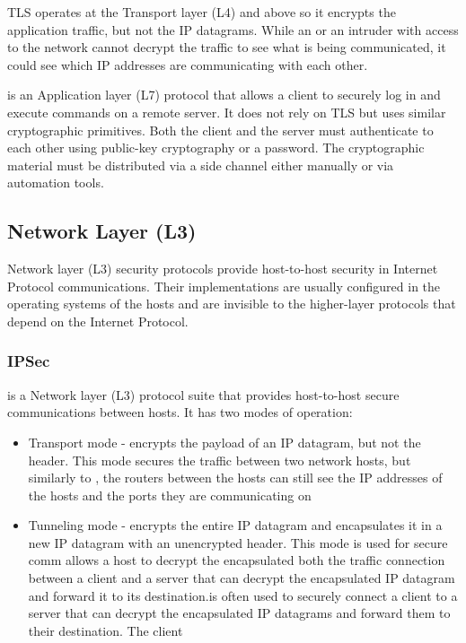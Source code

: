 TLS operates at the Transport layer (L4) and above so it encrypts the application traffic, but not the IP datagrams. While an  or an intruder with access to the network cannot decrypt the traffic to see what is being communicated, it could see which IP addresses are communicating with each other.

 is an Application layer (L7) protocol that allows a client to securely log in and execute commands on a remote server. It does not rely on TLS but uses similar cryptographic primitives. Both the client and the server must authenticate to each other using public-key cryptography or a password. The cryptographic material must be distributed via a side channel either manually or via automation tools.

\subsection{Network Layer (L3)}\label{thesis__020-internet.md__network-layer-l3-1}

Network layer (L3) security protocols provide host-to-host security in Internet Protocol communications. Their implementations are usually configured in the operating systems of the hosts and are invisible to the higher-layer protocols that depend on the Internet Protocol.

\subsubsection{IPSec}\label{thesis__020-internet.md__ipsec}

 is a Network layer (L3) protocol suite that provides host-to-host secure communications between  hosts. It has two modes of operation:

\begin{itemize}
\tightlist
\item
  Transport mode - encrypts the payload of an IP datagram, but not the header. This mode secures the traffic between two network hosts, but similarly to , the routers between the hosts can still see the IP addresses of the hosts and the ports they are communicating on
\item
  Tunneling mode - encrypts the entire IP datagram and encapsulates it in a new IP datagram with an unencrypted header. This mode is used for secure comm allows a host to decrypt the encapsulated both the traffic connection between a client and a server that can decrypt the encapsulated IP datagram and forward it to its destination.is often used to securely connect a client to a server that can decrypt the encapsulated IP datagrams and forward them to their destination. The client
\end{itemize}

